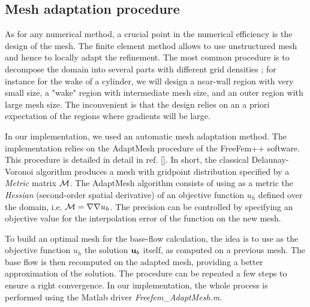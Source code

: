 \documentclass[twocolumn,10pt]{asme2ej}
\begin{document}
\subsection{Mesh adaptation procedure}
\vspace{.2cm}

As for any numerical method, a crucial point in the numerical efficiency is the design of the mesh. The finite element method allows to use unstructured mesh and hence to locally adapt the refinement. %
The most common procedure is to decompose the domain into several parts with different grid densities ; for instance for the wake of a cylinder, we will design a near-wall region with very small  size, a "wake" region with intermediate mesh size, and an outer region with large mesh size. The inconvenient is that the design relies on an a priori expectation of the regions where gradients will be large. 

In our implementation, we used an automatic mesh adaptation method. %
The implementation relies on the AdaptMesh procedure of the FreeFem++ software. This procedure is detailed in detail in ref. []. In short, 
the classical Delaunay-Voronoi algorithm produces a mesh with gridpoint distribution specified by a {\em Metric } matrix $\cal M$. The AdaptMesh algorithm consists of using as a metric the {\em Hessian} (second-order spatial derivative) of an objective function $u_h$ defined over the domain, i.e. ${\cal M} = \nabla \nabla u_h$. The precision can be controlled by specifying an objective value for the interpolation error of the function on the new mesh.

To build an optimal mesh for the base-flow calculation, the idea is to use as the objective function $u_h$ the solution ${\bf u}_b$ itself, as computed on a previous mesh.%
The base flow is then recomputed on the adapted mesh, providing a better approximation of the solution. The procedure can be repeated a few steps to ensure a right convergence.
In our implementation, the whole process is performed using the Matlab driver
 {\em Freefem\_AdaptMesh.m}.
\end{document}

